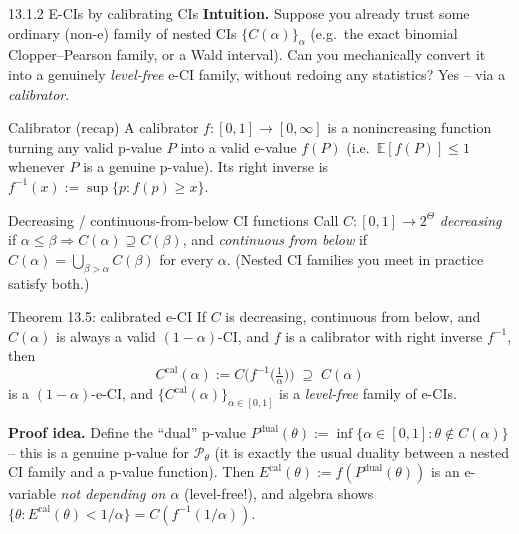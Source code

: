 \documentclass[aspectratio=169,10pt]{beamer}
\newcommand{\E}{\mathbb{E}}
\newcommand{\calP}{\mathcal{P}}
\newcommand{\Theset}{\Theta}
\begin{document}
\begin{frame}[allowframebreaks]{13.1.2 E-CIs by calibrating CIs}
  \textbf{Intuition.} Suppose you already trust some ordinary (non-e) family of nested CIs $\{C(\alpha)\}_{\alpha}$ (e.g.\ the exact binomial Clopper--Pearson family, or a Wald interval). Can you mechanically convert it into a genuinely \emph{level-free} e-CI family, without redoing any statistics? Yes -- via a \emph{calibrator}.

  \begin{block}{Calibrator (recap)}
    A calibrator $f:[0,1]\to[0,\infty]$ is a nonincreasing function turning any valid p-value $P$ into a valid e-value $f(P)$ (i.e.\ $\E[f(P)]\leq1$ whenever $P$ is a genuine p-value). Its right inverse is $f^{-1}(x) := \sup\{p : f(p)\geq x\}$.
  \end{block}

  \begin{block}{Decreasing / continuous-from-below CI functions}
    Call $C:[0,1]\to2^{\Theset}$ \emph{decreasing} if $\alpha\le\beta \Rightarrow C(\alpha)\supseteq C(\beta)$, and \emph{continuous from below} if $C(\alpha)=\bigcup_{\beta>\alpha}C(\beta)$ for every $\alpha$. (Nested CI families you meet in practice satisfy both.)
  \end{block}

  \framebreak

  \begin{block}{Theorem 13.5: calibrated e-CI}
    If $C$ is decreasing, continuous from below, and $C(\alpha)$ is always a valid $(1-\alpha)$-CI, and $f$ is a calibrator with right inverse $f^{-1}$, then
    \[
      C^{\mathrm{cal}}(\alpha) := C\!\Big(f^{-1}\big(\tfrac1\alpha\big)\Big) \;\supseteq\; C(\alpha)
    \]
    is a $(1-\alpha)$-e-CI, and $\{C^{\mathrm{cal}}(\alpha)\}_{\alpha\in[0,1]}$ is a \emph{level-free} family of e-CIs.
  \end{block}
  \textbf{Proof idea.} Define the ``dual'' p-value $P^{\mathrm{dual}}(\theta):=\inf\{\alpha\in[0,1]:\theta\notin C(\alpha)\}$ -- this is a genuine p-value for $\calP_\theta$ (it is exactly the usual duality between a nested CI family and a p-value function). Then $E^{\mathrm{cal}}(\theta):=f(P^{\mathrm{dual}}(\theta))$ is an e-variable \emph{not depending on $\alpha$} (level-free!), and algebra shows $\{\theta:E^{\mathrm{cal}}(\theta)<1/\alpha\} = C(f^{-1}(1/\alpha))$.

  \framebreak


\end{frame}
\end{document}
